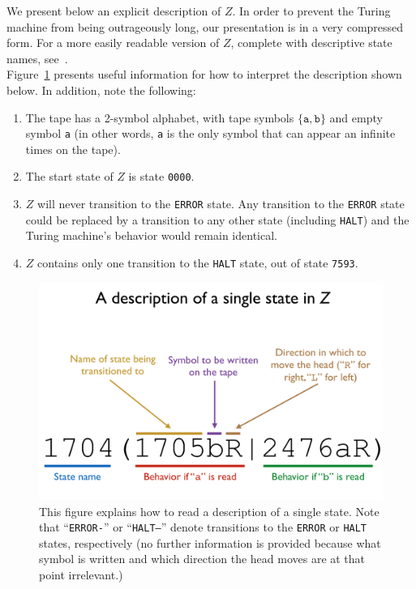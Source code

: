 \documentclass[11pt]{article}
\newcommand{\zhaltstate}{\texttt{7593}}
\begin{document}
\begin{appendices}
We present below an explicit description of $Z$. In order to prevent the Turing machine from being outrageously long, our presentation is in a very compressed form. For a more easily readable version of $Z$, complete with descriptive state names, see~\cite{github}. \\

Figure~\ref{fig:syntax} presents useful information for how to interpret the description shown below. In addition, note the following:

\begin{enumerate}

\item The tape has a 2-symbol alphabet, with tape symbols $\{\texttt{a}, \texttt{b}\}$ and empty symbol \texttt{a} (in other words, \texttt{a} is the only symbol that can appear an infinite times on the tape).
\item The start state of $Z$ is state \texttt{0000}.
\item $Z$ will never transition to the \texttt{ERROR} state. Any transition to the \texttt{ERROR} state could be replaced by a transition to any other state (including \texttt{HALT}) and the Turing machine's behavior would remain identical.
\item $Z$ contains only one transition to the \texttt{HALT} state, out of state \zhaltstate.

\end{enumerate}

\begin{figure} 
\begin{center} 
\includegraphics[scale=0.4]{figs/syntax.png}
\caption{This figure explains how to read a description of a single state. Note that ``\texttt{ERROR-}'' or ``\texttt{HALT--}'' denote transitions to the \texttt{ERROR} or \texttt{HALT} states, respectively (no further information is provided because what symbol is written and which direction the head moves are at that point irrelevant.) \label{fig:syntax}} 
\end{center} 
\end{figure}



\end{appendices}
\end{document}
